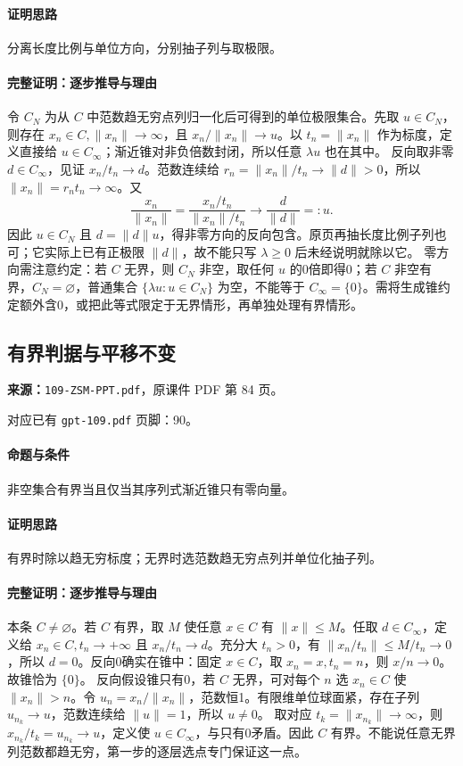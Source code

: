 \paragraph{证明思路}分离长度比例与单位方向，分别抽子列与取极限。
\paragraph{完整证明：逐步推导与理由}

令 $C_N$ 为从 $C$ 中范数趋无穷点列归一化后可得到的单位极限集合。先取 $u\in C_N$，则存在 $x_n\in C,\|x_n\|\to\infty$，且 $x_n/\|x_n\|\to u$。以 $t_n=\|x_n\|$ 作为标度，定义直接给 $u\in C_\infty$；渐近锥对非负倍数封闭，所以任意 $\lambda u$ 也在其中。
反向取非零 $d\in C_\infty$，见证 $x_n/t_n\to d$。范数连续给 $r_n=\|x_n\|/t_n\to\|d\|>0$，所以 $\|x_n\|=r_nt_n\to\infty$。又
\[\frac{x_n}{\|x_n\|}=\frac{x_n/t_n}{\|x_n\|/t_n}\longrightarrow\frac d{\|d\|}=:u.\]
因此 $u\in C_N$ 且 $d=\|d\|u$，得非零方向的反向包含。原页再抽长度比例子列也可；它实际上已有正极限 $\|d\|$，故不能只写 $\lambda\ge0$ 后未经说明就除以它。
零方向需注意约定：若 $C$ 无界，则 $C_N$ 非空，取任何 $u$ 的0倍即得0；若 $C$ 非空有界，$C_N=\varnothing$，普通集合 $\{\lambda u:u\in C_N\}$ 为空，不能等于 $C_\infty=\{0\}$。需将生成锥约定额外含0，或把此等式限定于无界情形，再单独处理有界情形。

\clearpage\subsection{有界判据与平移不变}
\textbf{来源：}\texttt{109-ZSM-PPT.pdf}，原课件 PDF 第 84 页。\par
对应已有 \texttt{gpt-109.pdf} 页脚：90。\par
\paragraph{命题与条件}非空集合有界当且仅当其序列式渐近锥只有零向量。
\paragraph{证明思路}有界时除以趋无穷标度；无界时选范数趋无穷点列并单位化抽子列。
\paragraph{完整证明：逐步推导与理由}

本条 $C\ne\varnothing$。若 $C$ 有界，取 $M$ 使任意 $x\in C$ 有 $\|x\|\le M$。任取 $d\in C_\infty$，定义给 $x_n\in C,t_n\to+\infty$ 且 $x_n/t_n\to d$。充分大 $t_n>0$，有 $\|x_n/t_n\|\le M/t_n\to0$，所以 $d=0$。反向0确实在锥中：固定 $x\in C$，取 $x_n=x,t_n=n$，则 $x/n\to0$。故锥恰为 $\{0\}$。
反向假设锥只有0，若 $C$ 无界，可对每个 $n$ 选 $x_n\in C$ 使 $\|x_n\|>n$。令 $u_n=x_n/\|x_n\|$，范数恒1。有限维单位球面紧，存在子列 $u_{n_k}\to u$，范数连续给 $\|u\|=1$，所以 $u\ne0$。
取对应 $t_k=\|x_{n_k}\|\to\infty$，则 $x_{n_k}/t_k=u_{n_k}\to u$，定义使 $u\in C_\infty$，与只有0矛盾。因此 $C$ 有界。不能说任意无界列范数都趋无穷，第一步的逐层选点专门保证这一点。

